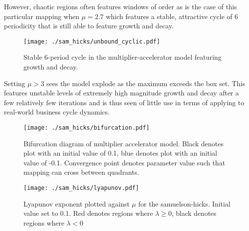 However, chaotic regions often features windows of order as is the case of this particular mapping when $\mu=2.7$ which features a stable, attractive cycle of 6 periodicity that is still able to feature growth and decay.
\begin{figure}
    \centering
    \texttt{[image: ./sam\_hicks/unbound\_cyclic.pdf]}
    \caption{Stable 6-period cycle in the multiplier-accelerator model featuring growth and decay.}
\end{figure}
Setting $\mu>3$ sees the model explode as the maximum exceeds the box set. This features unstable levels of extremely high magnitude growth and decay after a few relatively few iterations and is thus seen of little use in terms of applying to real-world business cycle dynamics.
\begin{figure}
    \centering
    \texttt{[image: ./sam\_hicks/bifurcation.pdf]}
    \caption{Bifurcation diagram of multiplier accelerator model. Black denotes plot with an initial value of 0.1, blue denotes plot with an initial value of -0.1. Convergence point denotes parameter value such that mapping can cross between quadrants.}
\end{figure}
\begin{figure}
    \centering
    \texttt{[image: ./sam\_hicks/lyapunov.pdf]}
    \caption{Lyapunov exponent plotted against $\mu$ for the samuelson-hicks. Initial value set to 0.1. Red denotes regions where $\lambda\geq0$, black denotes regions where $\lambda<0$}
\end{figure}